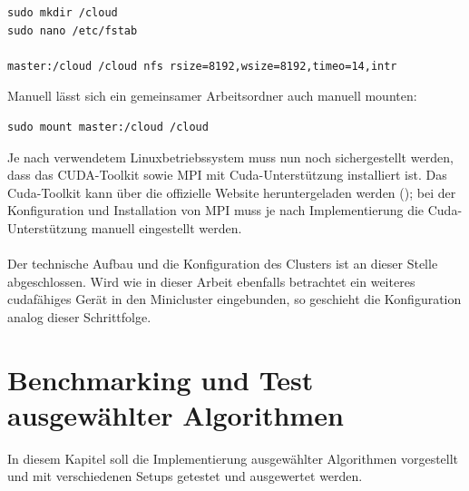 \documentclass[doktyp=semarbeit, sprache=german]{TUBAFarbeiten}
\begin{document}
\begin{lstlisting}
sudo mkdir /cloud
sudo nano /etc/fstab

master:/cloud /cloud nfs rsize=8192,wsize=8192,timeo=14,intr
\end{lstlisting}
Manuell lässt sich ein gemeinsamer Arbeitsordner auch manuell mounten:
\begin{lstlisting}
sudo mount master:/cloud /cloud
\end{lstlisting}
Je nach verwendetem Linuxbetriebssystem muss nun noch sichergestellt werden, dass das CUDA-Toolkit sowie MPI mit Cuda-Unterstützung installiert ist. Das Cuda-Toolkit kann über die offizielle Website heruntergeladen werden (\cite{CudaToolkit}); bei der Konfiguration und Installation von MPI muss je nach Implementierung die Cuda-Unterstützung manuell eingestellt werden.
\\\\Der technische Aufbau und die Konfiguration des Clusters ist an dieser Stelle abgeschlossen. Wird wie in dieser Arbeit ebenfalls betrachtet ein weiteres cudafähiges Gerät in den Minicluster eingebunden, so geschieht die Konfiguration analog dieser Schrittfolge.
\section{Benchmarking und Test ausgewählter Algorithmen}
In diesem Kapitel soll die Implementierung ausgewählter Algorithmen vorgestellt und mit verschiedenen Setups getestet und ausgewertet werden.
\end{document}
